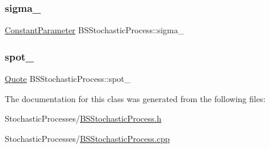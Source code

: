 \hypertarget{class_b_s_stochastic_process_a4d1125a7ed9bd09380b10160ef4277d5}{}\label{class_b_s_stochastic_process_a4d1125a7ed9bd09380b10160ef4277d5} 
\subsubsection{\texorpdfstring{sigma\+\_\+}{sigma\_}}
{\footnotesize\ttfamily \hyperlink{class_constant_parameter}{Constant\+Parameter} B\+S\+Stochastic\+Process\+::sigma\+\_\+\hspace{0.3cm}{\ttfamily [private]}}

\hypertarget{class_b_s_stochastic_process_ab09ba6f304aa5cef5afb06652c98967d}{}\label{class_b_s_stochastic_process_ab09ba6f304aa5cef5afb06652c98967d} 
\subsubsection{\texorpdfstring{spot\+\_\+}{spot\_}}
{\footnotesize\ttfamily \hyperlink{_name_def_8h_a642a6c5fd87319d922637de0e0bb0305}{Quote} B\+S\+Stochastic\+Process\+::spot\+\_\+\hspace{0.3cm}{\ttfamily [private]}}



The documentation for this class was generated from the following files\+:\begin{DoxyCompactItemize}
\item 
Stochastic\+Processes/\hyperlink{_b_s_stochastic_process_8h}{B\+S\+Stochastic\+Process.\+h}\item 
Stochastic\+Processes/\hyperlink{_b_s_stochastic_process_8cpp}{B\+S\+Stochastic\+Process.\+cpp}\end{DoxyCompactItemize}
